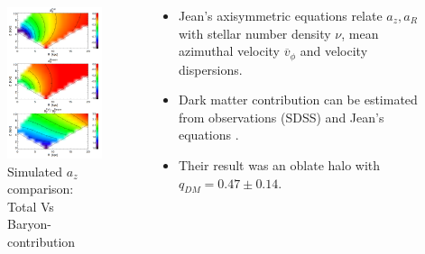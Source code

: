 \documentclass[xcolor=dvipsnames]{beamer}
\begin{document}
\begin{frame}

\begin{columns}[c]

\begin{column}{.5\textwidth}
\begin{figure}
\includegraphics[width=0.8\linewidth]{./pics/loebmanAccelerationCurves.png}
\caption{\tiny Simulated $a_z$ comparison: Total Vs Baryon-contribution}
\end{figure}
\end{column}

\begin{column}{.6\textwidth}
\centering
\small
\begin{itemize}

\item Jean's axisymmetric equations relate $a_z , a_R$ with stellar number density $\nu$, mean azimuthal velocity $\overline{v}_{\phi}$ and velocity dispersions.

\item Dark matter contribution can be estimated from observations (SDSS) and Jean's equations \cite[van der Marel 1991]{vanDerMarel1991}.

\item Their result was an oblate halo with $q_{DM} = 0.47 \pm 0.14$.

\end{itemize}

\end{column}

\end{columns}

\end{frame}
\end{document}
